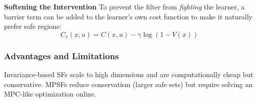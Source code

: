 \textbf{Softening the Intervention}
To prevent the filter from \textit{fighting} the learner,
a barrier term can be added to the learner's own cost function
to make it naturally prefer safe regions:
\[C_s(x,u) = C(x,u) - \gamma \log(1 - V(x))\]

\subsubsection{Advantages and Limitations}
Invariance-based SFs scale to high dimensions and are computationally
cheap but conservative.
MPSFs reduce conservatism (larger safe sets) but require solving an
MPC-like optimization online.

